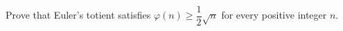 Prove that Euler's totient satisfies $\varphi(n)\ge\dfrac12\sqrt n$ for every positive integer $n$.
